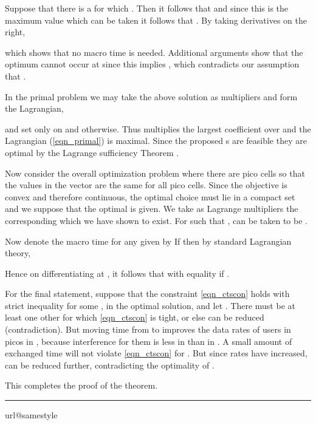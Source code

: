 \documentclass[12pt, draftcls, onecolumn]{IEEEtranTCOM}
\newcommand\qed{\hfill \rule{1.2mm}{2.8mm}}
\begin{document}
{Suppose that there is a  for which . Then it follows that  and since
this is the maximum value which can be taken it follows that . By taking derivatives on
the right,

which shows that no macro time is needed. Additional arguments show that the optimum cannot occur at 
since this implies , which contradicts our assumption that .

In the primal problem we may take the above solution  as multipliers and form the Lagrangian,

and set  only on  and  otherwise. Thus  multiplies the largest
coefficient  over  and the
Lagrangian (\ref{eqn_primal}) is maximal. Since the proposed s are feasible they are optimal
by the Lagrange sufficiency Theorem \cite{Whittle71}.

Now consider the overall optimization problem where there are  pico cells so that the values in the vector  are
the same for all pico cells. Since the objective is convex and therefore continuous, the optimal choice  must lie in a compact set and we suppose that the optimal  is given. We take as Lagrange multipliers the corresponding
 which we have shown to exist. For  such that ,
 can be taken to be .

Now denote the macro time for any given  by  If  then by standard Lagrangian theory,

Hence on differentiating  at , it follows that
 with equality if .


For the final statement, suppose that the constraint \eqref{eqn_ctscon} holds with strict inequality for some , in the optimal solution, and let . There must be at least one other  for which \eqref{eqn_ctscon} is tight, or else  can be reduced (contradiction). But moving time from  to  improves the data rates of users in picos in , because interference for them is less in  than in . A small amount of exchanged time will not violate \eqref{eqn_ctscon} for . But since rates have increased,  can be reduced further, contradicting the optimality of .



This completes the proof of the theorem. \qed

\begin{thebibliography}{10}
\providecommand{\url}[1]{#1}
\csname url@samestyle\endcsname
\providecommand{\newblock}{\relax}
\providecommand{\bibinfo}[2]{#2}
\providecommand{\BIBentrySTDinterwordspacing}{\spaceskip=0pt\relax}
\providecommand{\BIBentryALTinterwordstretchfactor}{4}
\providecommand{\BIBentryALTinterwordspacing}{\spaceskip=\fontdimen2\font plus
\BIBentryALTinterwordstretchfactor\fontdimen3\font minus
  \fontdimen4\font\relax}
\providecommand{\BIBforeignlanguage}[2]{{\expandafter\ifx\csname l@#1\endcsname\relax
\typeout{** WARNING: IEEEtran.bst: No hyphenation pattern has been}\typeout{** loaded for the language `#1'. Using the pattern for}\typeout{** the default language instead.}\else
\language=\csname l@#1\endcsname
\fi
#2}}
\providecommand{\BIBdecl}{\relax}
\BIBdecl


\end{thebibliography}}
\end{document}
